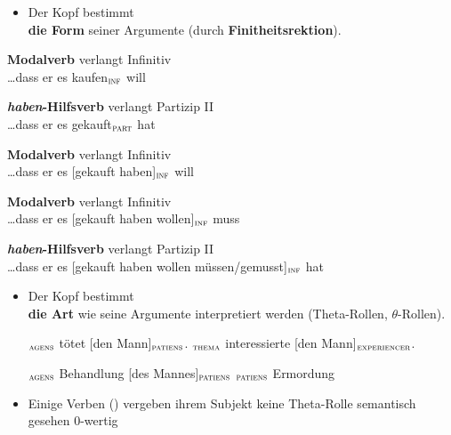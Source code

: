\begin{frame}

\begin{itemize}
	\item Der Kopf bestimmt\\ 
	\textbf{die Form} seiner Argumente (\zB durch \textbf{Finitheitsrektion}).
\end{itemize}

\ea \textbf{Modalverb} verlangt Infinitiv\\
\dots dass er es \alert{kaufen$_{\textsc{inf}}$ will}
\z

\pause

\ea \textbf{\emph{haben}-Hilfsverb} verlangt Partizip II\\
\dots dass er es \alert{gekauft$_{\textsc{part}}$ hat}
\z

\pause

\ea \textbf{Modalverb} verlangt Infinitiv\\
\dots dass er es \alert{[gekauft haben]$_{\textsc{inf}}$ will}
\z

\pause

\ea \textbf{Modalverb} verlangt Infinitiv\\
\dots dass er es \alert{[gekauft haben wollen]$_{\textsc{inf}}$ muss}
\z

\pause

\ea \textbf{\emph{haben}-Hilfsverb} verlangt Partizip II\\
\dots dass er es \alert{[gekauft haben wollen müssen/gemusst]$_{\textsc{inf}}$ hat}
\z

\end{frame}


\begin{frame}

\begin{itemize}
	\item Der Kopf bestimmt\\ 
	\textbf{die Art} wie seine Argumente interpretiert werden (Theta-Rollen, $\theta$-Rollen).

\eal 
{}$_{\textsc{agens}}$ tötet [den Mann]$_{\textsc{patiens}}$.
$_{\textsc{thema}}$ interessierte [den Mann]$_{\textsc{experiencer}}$.
\zl

\eal
\ex [Peters]$_{\textsc{agens}}$ Behandlung [des Mannes]$_{\textsc{patiens}}$
\ex [Peters]$_{\textsc{patiens}}$ Ermordung
\zl


	\item Einige Verben (\zB {}) vergeben ihrem Subjekt keine Theta-Rolle \ras semantisch gesehen 0-wertig

\end{itemize}

\end{frame}


